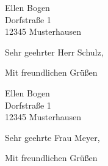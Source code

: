 \documentclass[%
,copy
,ngerman
,fontsize=11pt
,twoside=true
,enlargefirstpage
]{scrlttr2}
\begin{document}
\begin{letter}{%
Ellen Bogen \\
Dorfstraße 1\\
12345 Musterhausen
}


\opening{Sehr geehrter Herr Schulz,}

\blindtext[4]

\closing{Mit freundlichen Grüßen}

\end{letter}

\begin{letter}{%
Ellen Bogen \\
Dorfstraße 1\\
12345 Musterhausen
}


\opening{Sehr geehrte Frau Meyer,}

\blindtext[22]

\closing{Mit freundlichen Grüßen}

\end{letter}   
\end{document}
